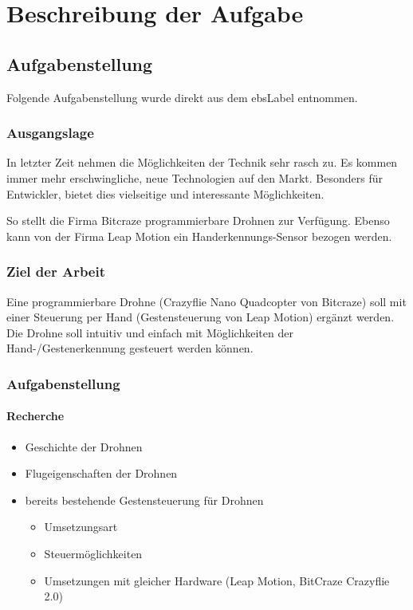\chapter{Beschreibung der Aufgabe}

\section{Aufgabenstellung}
Folgende Aufgabenstellung wurde direkt aus dem \gls{ebsLabel} entnommen.

\subsection{Ausgangslage}
In letzter Zeit nehmen die Möglichkeiten der Technik sehr rasch zu. Es kommen immer mehr erschwingliche, neue Technologien auf den Markt. Besonders für Entwickler, bietet dies vielseitige und interessante Möglichkeiten.

So stellt die Firma Bitcraze programmierbare Drohnen zur Verfügung. Ebenso kann von der Firma Leap Motion ein Handerkennungs-Sensor bezogen werden.

\subsection{Ziel der Arbeit}
Eine programmierbare Drohne (Crazyflie Nano Quadcopter von Bitcraze) soll mit einer Steuerung per Hand (Gestensteuerung von Leap Motion) ergänzt werden.
Die Drohne soll intuitiv und einfach mit Möglichkeiten der Hand-/Gestenerkennung gesteuert werden können.

\subsection{Aufgabenstellung}
\subsubsection{Recherche}
\begin{itemize}
	\item Geschichte der Drohnen
	\item Flugeigenschaften der Drohnen
	\item bereits bestehende Gestensteuerung für Drohnen
	\begin{itemize}
		\item Umsetzungsart
		\item Steuermöglichkeiten
		\item Umsetzungen mit gleicher Hardware (Leap Motion, BitCraze Crazyflie 2.0)
	\end{itemize}
\end{itemize}


